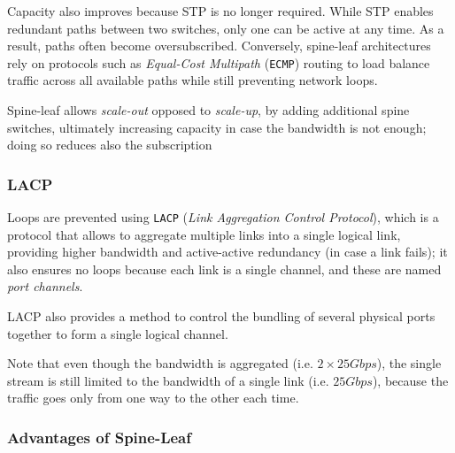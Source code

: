 Capacity also improves because STP is no longer required. While STP enables redundant paths between two switches, only one can be active at any time. As a result, paths often become oversubscribed. 
Conversely, spine-leaf architectures rely on protocols such as \textit{Equal-Cost Multipath} (\texttt{ECMP}) routing to load balance traffic across all available paths while still preventing network loops.

Spine-leaf allows \textit{scale-out} opposed to \textit{scale-up}, by adding additional spine switches, ultimately increasing capacity in case the bandwidth is not enough; doing so reduces also the subscription

\subsubsection{LACP}
\label{sec:LACP}
Loops are prevented using \texttt{LACP} (\textit{Link Aggregation Control Protocol}), which is a protocol that allows to aggregate multiple links into a single logical link, providing higher bandwidth and active-active redundancy (in case a link fails);
it also ensures no loops because each link is a single channel, and these are named \textit{port channels}.

LACP also provides a method to control the bundling of several physical ports together to form a single logical channel.

Note that even though the bandwidth is aggregated (i.e. $2\times 25Gbps$), the single stream is still limited to the bandwidth of a single link (i.e. $25Gbps$), because the traffic goes only from one way to the other each time.

\subsubsection{Advantages of Spine-Leaf}

